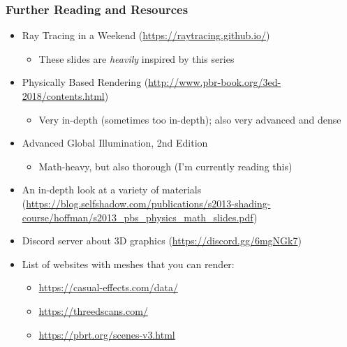\documentclass{beamer}
\begin{document}
\begin{frame}
	\frametitle{Further Reading and Resources}
	
	\begin{itemize}
		\item Ray Tracing in a Weekend (\url{https://raytracing.github.io/})
		\begin{itemize}
			\item These slides are \textit{heavily} inspired by this series
		\end{itemize}
		\item Physically Based Rendering (\url{http://www.pbr-book.org/3ed-2018/contents.html})
		\begin{itemize}
			\item Very in-depth (sometimes too in-depth); also very advanced and dense
		\end{itemize}
		\item Advanced Global Illumination, 2nd Edition
		\begin{itemize}
			\item Math-heavy, but also thorough (I'm currently reading this)
		\end{itemize}
		\item An in-depth look at a variety of materials (\url{https://blog.selfshadow.com/publications/s2013-shading-course/hoffman/s2013\_pbs\_physics\_math\_slides.pdf})
		\item Discord server about 3D graphics (\url{https://discord.gg/6mgNGk7})
		\item List of websites with meshes that you can render:
		\begin{itemize}
			\item \url{https://casual-effects.com/data/}
			\item \url{https://threedscans.com/}
			\item \url{https://pbrt.org/scenes-v3.html}
		\end{itemize}
	\end{itemize}	
\end{frame}
\end{document}
